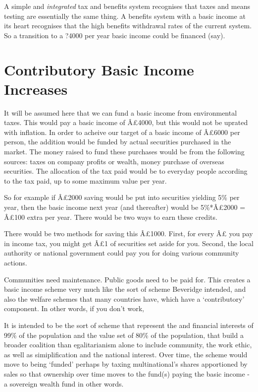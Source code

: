 \documentclass[]{tufte-handout}
\begin{document}
A simple and \emph{integrated} tax and benefits system recognises that
taxes and means testing are essentially the same thing. A benefits
system with a basic income at its heart recognises that the high
benefits withdrawal rates of the current system. So a transition to a
?4000 per year basic income could be financed (say).

\hypertarget{contributory-basic-income-increases}{%
\section{Contributory Basic Income
Increases}\label{contributory-basic-income-increases}}

It will be assumed here that we can fund a basic income from
environmental taxes. This would pay a basic income of Â£4000, but this
would not be uprated with inflation. In order to acheive our target of a
basic income of Â£6000 per person, the addition would be funded by
actual securities purchased in the market. The money raised to fund
these purchases would be from the following sources: taxes on company
profits or wealth, money purchase of overseas securities. The allocation
of the tax paid would be to everyday people according to the tax paid,
up to some maximum value per year.

So for example if Â£2000 saving would be put into securities yielding
5\% per year, then the basic income next year (and thereafter) would be
5\%*Â£2000 = Â£100 extra per year. There would be two ways to earn these
credits.

There would be two methods for saving this Â£1000. First, for every Â£
you pay in income tax, you might get Â£1 of securities set aside for
you. Second, the local authority or national government could pay you
for doing various community actions.

Communities need maintenance. Public goods need to be paid for. This
creates a basic income scheme very much like the sort of scheme
Beveridge intended, and also the welfare schemes that many countries
have, which have a `contributory' component. In other words, if you
don't work,

It is intended to be the sort of scheme that represent the and financial
interests of 99\% of the population and the value set of 80\% of the
population, that build a broader coalition than egalitarianism alone to
include community, the work ethic, as well as simiplification and the
national interest. Over time, the scheme would move to being `funded'
perhaps by taxing multinational's shares apportioned by sales so that
ownership over time moves to the fund(s) paying the basic income - a
sovereign wealth fund in other words.
\end{document}

